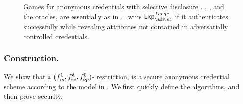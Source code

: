 \begin{figure}[ht!]
  \centering
  \caption{Games for anonymous credentials with selective disclosure
    \cite{fhs19}. \OWNR, \ATTR, and the oracles, are essentially as in
    \UAS. \adv~wins $\Exp^{forge}_{\adv,ac}$ if it authenticates successfully
    while revealing attributes not contained in adversarially controlled
    credentials.}
  \label{fig:model-ac}  
\end{figure}

\subsubsection{\CUASAC Construction.} %
We show that a $(f_{is}^1,f_{ev}^{\mathbf{d}},f_{op}^0)$-\CUASGenInt
restriction, is a secure anonymous credential scheme according to the model in
\cite{fhs19}. We first quickly define the algorithms, and then prove security.

